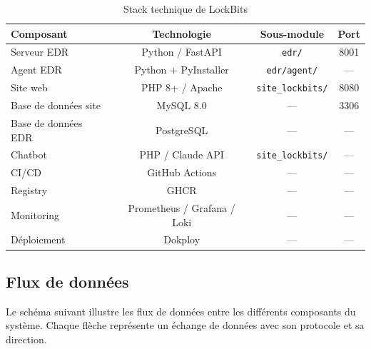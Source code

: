 \begin{table}[H]
  \centering
  \caption{Stack technique de LockBits}
  \label{tab:stack-technique}
  \small
  \begin{tabular}{lccc}
    \toprule
    \textbf{Composant} & \textbf{Technologie} & \textbf{Sous-module} & \textbf{Port} \\
    \midrule
    Serveur EDR        & Python / FastAPI     & \texttt{edr/}        & 8001 \\
    Agent EDR          & Python + PyInstaller & \texttt{edr/agent/}  & --- \\
    Site web           & PHP 8+ / Apache      & \texttt{site\_lockbits/} & 8080 \\
    Base de données site & MySQL 8.0          & ---                  & 3306 \\
    Base de données EDR  & PostgreSQL         & ---                  & --- \\
    Chatbot            & PHP / Claude API     & \texttt{site\_lockbits/} & --- \\
    CI/CD              & GitHub Actions       & ---                  & --- \\
    Registry           & GHCR                 & ---                  & --- \\
    Monitoring         & Prometheus / Grafana / Loki & ---          & --- \\
    Déploiement        & Dokploy              & ---                  & --- \\
    \bottomrule
  \end{tabular}
\end{table}

\subsection{Flux de données}

Le schéma suivant illustre les flux de données entre les différents
composants du système. Chaque flèche représente un échange de données
avec son protocole et sa direction.

